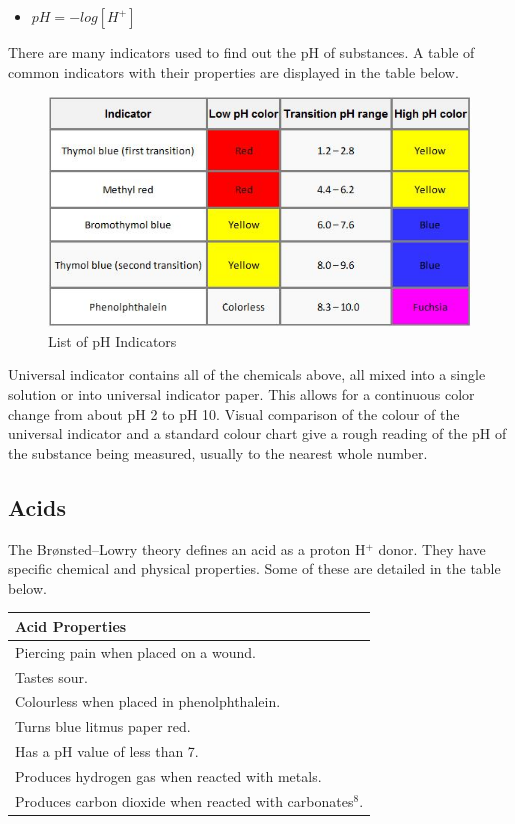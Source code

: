 \begin{itemize}
\item $pH = - log [H^+]$
\end{itemize}

There are many indicators used to find out the pH of substances. A table of common indicators with their properties are displayed in the table below.

\begin{figure}[H]
    \includegraphics[width=\textwidth]{./Planning/Images/Indicators.jpg}
    \caption{List of pH Indicators} \label{fig:pH Indicators}
\end{figure}

Universal indicator contains all of the chemicals above, all mixed into a single solution or into universal indicator paper. This allows for a continuous color change from about pH 2 to pH 10. Visual comparison of the colour of the universal indicator and a standard colour chart give a rough reading of the pH of the substance being measured, usually to the nearest whole number. 


	\subsection{Acids}

The Brønsted–Lowry theory defines an acid as a proton H$^+$ donor. They have specific chemical and physical properties. Some of these are detailed in the table below.

\begin{center}
\begin{tabular}{|l|}
    \hline
    \textbf{Acid Properties}  \\ \hline
Piercing pain when placed on a wound. \\ \hline
Tastes sour. \\ \hline
Colourless when placed in phenolphthalein. \\ \hline
Turns blue litmus paper red. \\ \hline
Has a pH value of less than 7. \\ \hline
Produces hydrogen gas when reacted with metals. \\ \hline
Produces carbon dioxide when reacted with carbonates$^8$. \\ \hline
\end{tabular}

\label{tab:Acid Properties}
\end{center}

